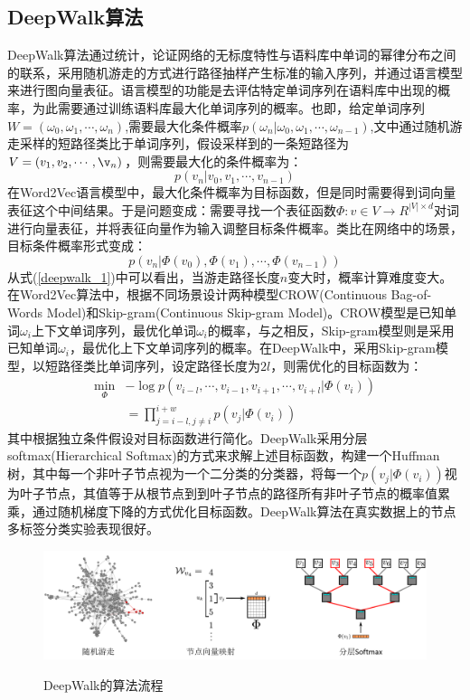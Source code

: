 \subsection{DeepWalk算法}
DeepWalk算法通过统计，论证网络的无标度特性与语料库中单词的幂律分布之间的联系，采用随机游走的方式进行路径抽样产生标准的输入序列，并通过语言模型来进行图向量表征。语言模型的功能是去评估特定单词序列在语料库中出现的概率，为此需要通过训练语料库最大化单词序列的概率。也即，给定单词序列$W = (\omega_0, \omega_1,\cdots,\omega_n)$,需要最大化条件概率$p(\omega_n |\omega_0,\omega_1,\cdots,\omega_{n-1})$,文中通过随机游走采样的短路径类比于单词序列，假设采样到的一条短路径为$V = (v_1, v_2, \cdots, \v_n)$，则需要最大化的条件概率为：
\begin{equation}
	p(v_n | v_0, v_1,\cdots,v_{n-1})
\end{equation}
在Word2Vec语言模型中，最大化条件概率为目标函数，但是同时需要得到词向量表征这个中间结果。于是问题变成：需要寻找一个表征函数$\Phi:v\in V \rightarrow R^{|V|\times d}$对词进行向量表征，并将表征向量作为输入调整目标条件概率。类比在网络中的场景，目标条件概率形式变成：
\begin{equation}\label{deepwalk_1}
	p(v_n | \Phi(v_0), \Phi(v_1),\cdots,\Phi(v_{n-1})) 
\end{equation}
从式(\ref{deepwalk_1})中可以看出，当游走路径长度$n$变大时，概率计算难度变大。在Word2Vec算法中，根据不同场景设计两种模型CROW(Continuous Bag-of-Words Model)和Skip-gram(Continuous Skip-gram Model)。CROW模型是已知单词$\omega_i$上下文单词序列，最优化单词$\omega_i$的概率，与之相反，Skip-gram模型则是采用已知单词$\omega_i$，最优化上下文单词序列的概率。在DeepWalk中，采用Skip-gram模型，以短路径类比单词序列，设定路径长度为$2l$，则需优化的目标函数为：
\begin{equation}
\begin{aligned}
	\min_{\Phi} &-\log p(v_{i-l},\cdots,v_{i-1},v_{i+1},\cdots,v_{i+l}| \Phi(v_i)) \\
	&= \prod_{j=i-l,j\neq i}^{i+w} p(v_j|\Phi(v_i))
\end{aligned}
\end{equation}
其中根据独立条件假设对目标函数进行简化。DeepWalk采用分层softmax(Hierarchical Softmax)的方式来求解上述目标函数，构建一个Huffman树，其中每一个非叶子节点视为一个二分类的分类器，将每一个$p(v_j|\Phi(v_i))$视为叶子节点，其值等于从根节点到到叶子节点的路径所有非叶子节点的概率值累乘，通过随机梯度下降的方式优化目标函数。DeepWalk算法在真实数据上的节点多标签分类实验表现很好。
\begin{figure}[!ht]
	\centering
	{\includegraphics[width=6in]{figures/deepwalk2.png}}
	\caption{DeepWalk的算法流程}\label{img2.5}
\end{figure}

